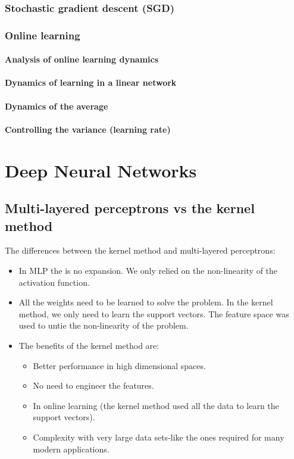 \documentclass[11pt]{book} %
\begin{document}
\subsection{Stochastic gradient descent (SGD)}
\subsection{Online learning}
\subsubsection{Analysis of online learning dynamics}
\subsubsection{Dynamics of learning in a linear network}
\subsubsection{Dynamics of the average}
\subsubsection{Controlling the variance (learning rate)}


%
%
%
%
%
%
%
%
%
%
%
%
%
%
%
%


\chapter{Deep Neural Networks}

\section{Multi-layered perceptrons vs the kernel method}
The differences between the kernel method and multi-layered perceptrons:
\begin{itemize}
    \item In MLP the is no expansion. We only relied on the non-linearity of the activation function.
    \item All the weights need to be learned to solve the problem. In the kernel method, we only need to learn the support vectors. 
    The feature space was used to untie the non-linearity of the problem.
    \item The benefits of the kernel method are:
    \begin{itemize}
        \item Better performance in high dimensional spaces.
        \item No need to engineer the features.
        \item In online learning (the kernel method used all the data to learn the support vectors).
        \item Complexity with very large data sets-like the ones required for many modern applications.
    \end{itemize}
\end{itemize}
\end{document}
